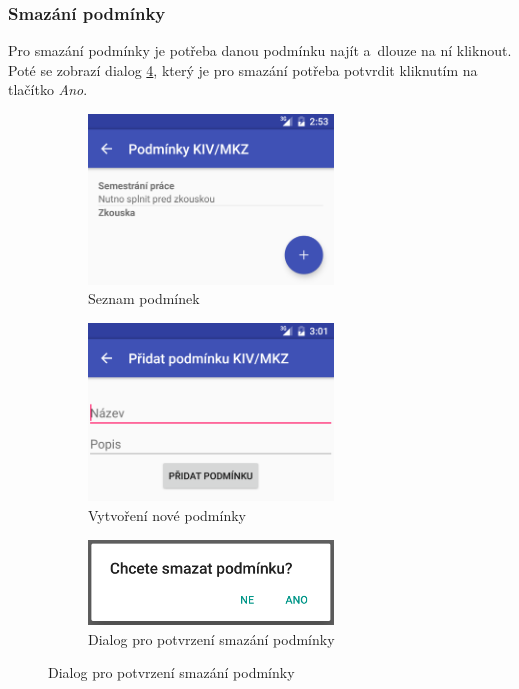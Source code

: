 \documentclass[12pt, a4paper]{article}
\begin{document}
			\subsubsection{Smazání podmínky}
			Pro smazání podmínky je potřeba danou podmínku najít a~dlouze na ní kliknout. Poté se zobrazí dialog \ref{deleteTerm}, který je pro smazání potřeba potvrdit kliknutím na tlačítko \emph{Ano}.
		
			\begin{figure}[ht!]
				\centering
				\caption{Podmínky předmětu KIV/MKZ}
				\label{terms}
				\begin{subfigure}{.5\textwidth}
					\centering
					\caption{Seznam podmínek}
					\label{termsList}
					\includegraphics[width=6.5cm]{img/terms.png}
				\end{subfigure}%
				\begin{subfigure}{.5\textwidth}
					\centering
					\caption{Vytvoření nové podmínky}
					\label{addTerm}
					\includegraphics[width=6.5cm]{img/addTerm.png}
				\end{subfigure}
				\begin{subfigure}{.5\textwidth}
					\centering
					\caption{Dialog pro potvrzení smazání podmínky}
					\label{deleteTerm}
					\includegraphics[width=6.5cm]{img/deleteTerm.png}
				\end{subfigure}
			\end{figure}
			\FloatBarrier
		
\end{document}

